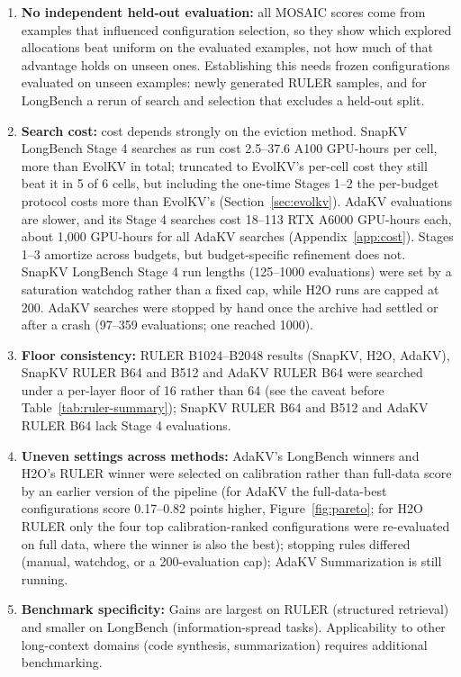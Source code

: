 \documentclass[11pt]{article}
\begin{document}
\begin{enumerate}
\item \textbf{No independent held-out evaluation:} all MOSAIC scores come from examples that influenced configuration selection, so they show which explored allocations beat uniform on the evaluated examples, not how much of that advantage holds on unseen ones. Establishing this needs frozen configurations evaluated on unseen examples: newly generated RULER samples, and for LongBench a rerun of search and selection that excludes a held-out split.
\item \textbf{Search cost:} cost depends strongly on the eviction method. SnapKV LongBench Stage 4 searches as run cost 2.5--37.6 A100 GPU-hours per cell, more than EvolKV in total; truncated to EvolKV's per-cell cost they still beat it in 5 of 6 cells, but including the one-time Stages 1--2 the per-budget protocol costs more than EvolKV's (Section~\ref{sec:evolkv}). AdaKV evaluations are slower, and its Stage 4 searches cost 18--113 RTX A6000 GPU-hours each, about 1{,}000 GPU-hours for all AdaKV searches (Appendix~\ref{app:cost}). Stages 1--3 amortize across budgets, but budget-specific refinement does not. SnapKV LongBench Stage 4 run lengths (125--1000 evaluations) were set by a saturation watchdog rather than a fixed cap, while H2O runs are capped at 200. AdaKV searches were stopped by hand once the archive had settled or after a crash (97--359 evaluations; one reached 1000).
\item \textbf{Floor consistency:} RULER B1024--B2048 results (SnapKV, H2O, AdaKV), SnapKV RULER B64 and B512 and AdaKV RULER B64 were searched under a per-layer floor of 16 rather than 64 (see the caveat before Table~\ref{tab:ruler-summary}); SnapKV RULER B64 and B512 and AdaKV RULER B64 lack Stage 4 evaluations.
\item \textbf{Uneven settings across methods:} AdaKV's LongBench winners and H2O's RULER winner were selected on calibration rather than full-data score by an earlier version of the pipeline (for AdaKV the full-data-best configurations score 0.17--0.82 points higher, Figure~\ref{fig:pareto}; for H2O RULER only the four top calibration-ranked configurations were re-evaluated on full data, where the winner is also the best); stopping rules differed (manual, watchdog, or a 200-evaluation cap); AdaKV Summarization is still running.
\item \textbf{Benchmark specificity:} Gains are largest on RULER (structured retrieval) and smaller on LongBench (information-spread tasks). Applicability to other long-context domains (code synthesis, summarization) requires additional benchmarking.

\end{enumerate}
\end{document}
